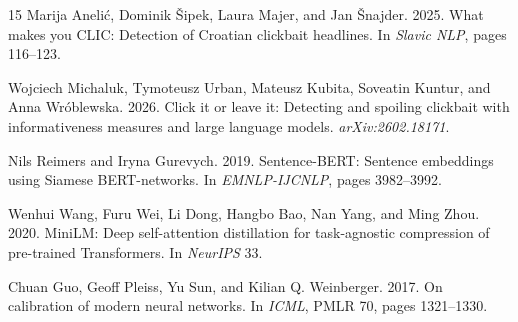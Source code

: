 \documentclass[11pt]{article}
\begin{document}
\begin{thebibliography}{15}
Marija An\dj eli\'c, Dominik \v{S}ipek, Laura Majer, and Jan \v{S}najder. 2025.
What makes you CLIC: Detection of Croatian clickbait headlines. In \emph{Slavic NLP}, pages 116--123.

Wojciech Michaluk, Tymoteusz Urban, Mateusz Kubita, Soveatin Kuntur, and Anna Wr\'oblewska. 2026.
Click it or leave it: Detecting and spoiling clickbait with informativeness measures and large language models. \emph{arXiv:2602.18171}.

Nils Reimers and Iryna Gurevych. 2019.
Sentence-BERT: Sentence embeddings using Siamese BERT-networks. In \emph{EMNLP-IJCNLP}, pages 3982--3992.

Wenhui Wang, Furu Wei, Li Dong, Hangbo Bao, Nan Yang, and Ming Zhou. 2020.
MiniLM: Deep self-attention distillation for task-agnostic compression of pre-trained Transformers. In \emph{NeurIPS} 33.

Chuan Guo, Geoff Pleiss, Yu Sun, and Kilian Q. Weinberger. 2017.
On calibration of modern neural networks. In \emph{ICML}, PMLR 70, pages 1321--1330.
\end{thebibliography}
\end{document}
